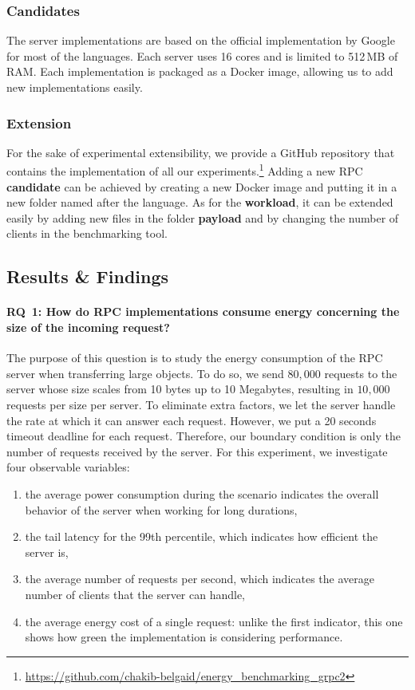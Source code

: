 \subsubsection*{Candidates}
The server implementations are based on the official implementation by Google for most of the languages.
Each server uses 16 cores and is limited to 512\,MB of RAM.
Each implementation is packaged as a Docker image, allowing us to add new implementations easily.

\subsubsection{Extension}
For the sake of experimental extensibility, we provide a GitHub repository that contains the implementation of all our experiments.\footnote{\url{https://github.com/chakib-belgaid/energy_benchmarking_grpc2}}
Adding a new RPC \textbf{candidate} can be achieved by creating a new Docker image and putting it in a new folder named after the language.
As for the \textbf{workload}, it can be extended easily by adding new files in the folder \textbf{payload} and by changing the number of clients in the benchmarking tool.

\subsection{Results \& Findings}
\paragraph{\textsc{RQ}~1: How do RPC implementations consume energy concerning the size of the incoming request?}

The purpose of this question is to study the energy consumption of the RPC server when transferring large objects.
To do so, we send $80,000$ requests to the server whose size scales from 10 bytes up to 10 Megabytes, resulting in $10,000$ requests per size per server.
To eliminate extra factors, we let the server handle the rate at which it can answer each request.
However, we put a 20 seconds timeout deadline for each request.
Therefore, our boundary condition is only the number of requests received by the server.
For this experiment, we investigate four observable variables:
\begin{enumerate}
    \item the \textsf{average power consumption} during the scenario indicates the overall behavior of the server when working for long durations,
    \item the \textsf{tail latency} for the 99th percentile, which indicates how efficient the server is,
    \item the \textsf{average number of requests per second}, which indicates the average number of clients that the server can handle,
    \item the \textsf{average energy cost} of a single request: unlike the first indicator, this one shows how green the implementation is considering performance.
\end{enumerate}


